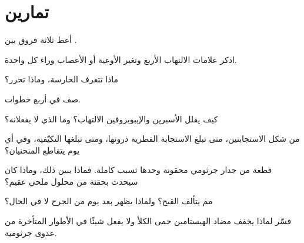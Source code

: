 \section{تمارين}

\begin{exercise}[$\star$]\label{exo:g12:innate-immunity:1}
أعط ثلاثة فروق بين  .
\end{exercise}

\begin{exercise}[$\star$]\label{exo:g12:innate-immunity:2}
اذكر علامات الالتهاب الأربع وتغير الأوعية أو الأعصاب وراء كل واحدة.
\end{exercise}

\begin{exercise}[$\star$]\label{exo:g12:innate-immunity:3}
ماذا تتعرف  الحارسة، وماذا تحرر؟
\end{exercise}

\begin{exercise}[$\star$]\label{exo:g12:innate-immunity:4}
صف  في أربع خطوات.
\end{exercise}

\begin{exercise}[$\star$]\label{exo:g12:innate-immunity:5}
كيف يقلل الأسبرين والإيبوبروفين الالتهاب؟ وما الذي لا يفعلانه؟
\end{exercise}

\begin{exercise}[$\star\star$]\label{exo:g12:innate-immunity:6}
من شكل الاستجابتين، متى تبلغ الاستجابة الفطرية ذروتها، ومتى تبلغها
التكيّفية، وفي أي يوم يتقاطع المنحنيان؟
\end{exercise}

\begin{exercise}[$\star\star$]\label{exo:g12:innate-immunity:7}
قطعة من جدار جرثومي محقونة وحدها تسبب  كاملة.
فماذا يبين ذلك، وماذا كان سيحدث بحقنة من محلول ملحي عقيم؟
\end{exercise}

\begin{exercise}[$\star\star$]\label{exo:g12:innate-immunity:8}
مم يتألف القيح؟ ولماذا يظهر بعد يوم من الجرح لا في الحال؟
\end{exercise}

\begin{exercise}[$\star\star$]\label{exo:g12:innate-immunity:9}
فسّر لماذا يخفف مضاد الهيستامين حمى الكلأ ولا يفعل شيئًا في الأطوار
المتأخرة من عدوى جرثومية.
\end{exercise}

